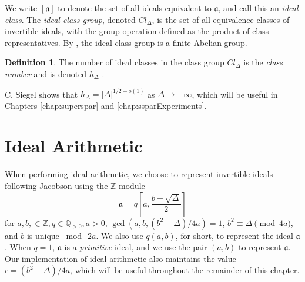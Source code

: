 \documentclass{ucalgthes1}
\theoremstyle{definition}
\newtheorem{defn}[thm]{Definition}
\newcommand{\ZZ}{\mathbb{Z}}
\newcommand{\QQgtz}{\mathbb{Q}_{>0}}
\newcommand{\ideal}{\mathfrak}
\newcommand{\idealclass}[1]{\left[ \ideal #1 \right]}
\newcommand{\aclass}{\idealclass a}
\begin{document}
We write $\aclass$ to denote the set of all ideals equivalent to $\ideal a$, and call this an \emph{ideal class}.  The \emph{ideal class group}, denoted $Cl_\Delta$, is the set of all equivalence classes of invertible ideals, with the group operation defined as the product of class representatives.  By \cite[p.136]{Cohn1980}, the ideal class group is a finite Abelian group.

\begin{defn}
The number of ideal classes in the class group $Cl_\Delta$ is the \emph{class number} and is denoted $h_\Delta$ \cite[p.153]{Jacobson2009}.
\end{defn}

\noindent
C. Siegel \cite[p.247]{Crandall2001} shows that $h_\Delta = |\Delta|^{1/2 + o(1)}$ as $\Delta \rightarrow -\infty$, which will be useful in Chapters \ref{chap:superspar} and \ref{chap:ssparExperiments}.


\section{Ideal Arithmetic}
\label{sec:idealArithmetic}

When performing ideal arithmetic, we choose to represent invertible ideals following Jacobson \cite[p.13, Equation 2.1]{Jacobson1999} using the $\ZZ$-module
\[
	\ideal a = q\left[a, \frac{b+\sqrt{\Delta}}{2} \right]
\]
for $a, b, \in \ZZ, q \in \QQgtz, a > 0$, $\gcd(a, b, (b^2-\Delta)/4a) = 1$, $b^2 \equiv \Delta \pmod{4a}$, and $b$ is unique $\bmod ~2a$.  We also use $q(a, b)$, for short, to represent the ideal $\ideal a$.  When $q = 1$, $\ideal a$ is a \emph{primitive} ideal, and we use the pair $(a, b)$ to represent $\ideal a$.  Our implementation of ideal arithmetic also maintains the value $c = (b^2 - \Delta)/4a$, which will be useful throughout the remainder of this chapter.
\end{document}
